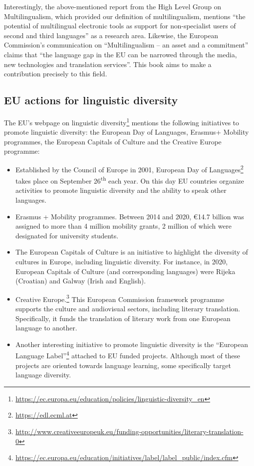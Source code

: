\documentclass[output=paper]{langscibook}
\begin{document}
Interestingly, the above-mentioned report from the High Level Group on Multilingualism, which provided our definition of multilingualism, mentions “the potential of multilingual electronic tools as support for non-specialist users of second and third languages” \citep{EuropeanCommission2007} as a research area. Likewise, the European Commission's communication on “Multilingualism – an asset and a commitment” \citep{EuropeanCommission2014} claims that “the language gap in the EU can be narrowed through the media, new technologies and translation services”. This book aims to make a contribution precisely to this field.


\subsection{EU actions for linguistic diversity}

The EU’s webpage on linguistic diversity\footnote{\url{https://ec.europa.eu/education/policies/linguistic-diversity_en}} mentions the following initiatives to promote linguistic diversity: the European Day of Languages, Erasmus+ Mobility programmes, the European Capitals of Culture and the Creative Europe programme:

\begin{itemize}
\item Established by the Council of Europe in 2001, European Day of Languages\footnote{\url{https://edl.ecml.at}} takes place on September 26\textsuperscript{th} each year. On this day EU countries organize activities to promote linguistic diversity and the ability to speak other languages.
\item Erasmus + Mobility programmes. Between 2014 and 2020, €14.7 billion was assigned to more than 4 million mobility grants, 2 million of which were designated for university students.
\item The European Capitals of Culture is an initiative to highlight the diversity of cultures in Europe, including linguistic diversity. For instance, in 2020, European Capitals of Culture (and corresponding languages) were Rijeka (Croatian) and Galway (Irish and English).
\item Creative Europe.\footnote{\url{http://www.creativeeuropeuk.eu/funding-opportunities/literary-translation-0}} This European Commission framework programme supports the culture and audiovisual sectors, including literary translation. Specifically, it funds the translation of literary work from one European language to another.
\item Another interesting initiative to promote linguistic diversity is the “European Language Label”\footnote{\url{https://ec.europa.eu/education/initiatives/label/label_public/index.cfm}} attached to EU funded projects. Although most of these projects are oriented towards language learning, some specifically target language diversity.
\end{itemize}
\end{document}
